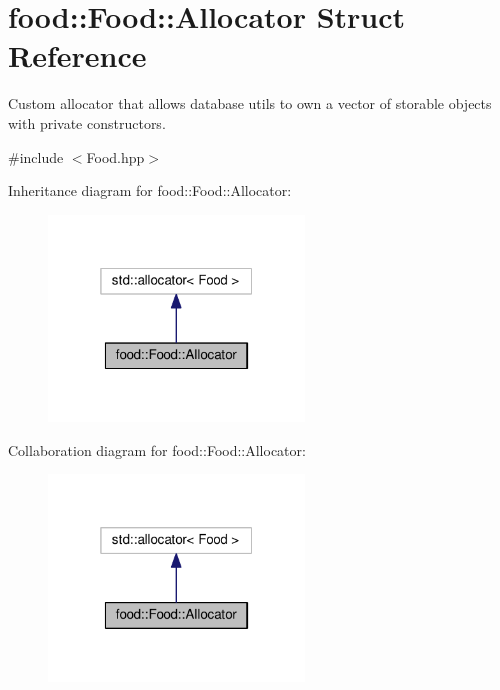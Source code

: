 \hypertarget{structfood_1_1_food_1_1_allocator}{}\section{food\+:\+:Food\+:\+:Allocator Struct Reference}
\label{structfood_1_1_food_1_1_allocator}


Custom allocator that allows database utils to own a vector of storable objects with private constructors.  




{\ttfamily \#include $<$Food.\+hpp$>$}



Inheritance diagram for food\+:\+:Food\+:\+:Allocator\+:
\nopagebreak
\begin{figure}[H]
\begin{center}
\leavevmode
\includegraphics[width=193pt]{structfood_1_1_food_1_1_allocator__inherit__graph}
\end{center}
\end{figure}


Collaboration diagram for food\+:\+:Food\+:\+:Allocator\+:
\nopagebreak
\begin{figure}[H]
\begin{center}
\leavevmode
\includegraphics[width=193pt]{structfood_1_1_food_1_1_allocator__coll__graph}
\end{center}
\end{figure}
